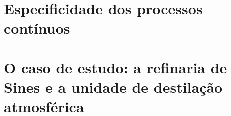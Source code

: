 \section{Especificidade dos processos contínuos}
\label{sec:processos-continuos}



\section{O caso de estudo: a refinaria de Sines e a unidade de destilação atmosférica}
\label{sec:caso-estudo}

